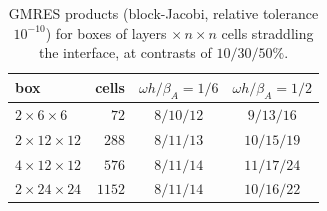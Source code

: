 \documentclass[11pt,a4paper]{article}
\begin{document}
\begin{table}[htbp]
\centering
\caption{GMRES products (block-Jacobi, relative tolerance $10^{-10}$) for boxes of layers $\times\,n\times n$
cells straddling the interface, at contrasts of $10/30/50\%$.}
\label{tab:gmres}
\begin{tabular}{lrcc}
\toprule
box & cells & $\omega h/\beta_A=1/6$ & $\omega h/\beta_A=1/2$ \\
\midrule
$2\times6\times6$ & $72$ & $8/10/12$ & $9/13/16$ \\
$2\times12\times12$ & $288$ & $8/11/13$ & $10/15/19$ \\
$4\times12\times12$ & $576$ & $8/11/14$ & $11/17/24$ \\
$2\times24\times24$ & $1152$ & $8/11/14$ & $10/16/22$ \\
\bottomrule
\end{tabular}
\end{table}
\end{document}
